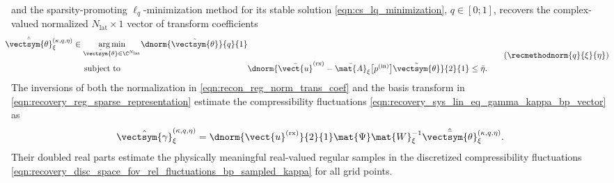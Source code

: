 and
the sparsity-promoting $\ell_{q}$-minimization method for
its stable solution
\eqref{eqn:cs_lq_minimization},
$q \in [ 0; 1 ]$, recovers
the complex-valued normalized
$N_{\text{lat}} \times 1$ vector of
transform coefficients
\begin{equation}
\begin{alignedat}{2}
  \hspace{-0.75em}
  \hat{\bar{\vectsym{\theta}}}_{\xi}^{(\kappa, q, \eta)}
  &\in
  \underset{ \tilde{\vectsym{\theta}} \in \C^{ N_{\text{lat}} } }{ \arg\min }
  \dnorm{ \tilde{\vectsym{\theta}} }{q}{1}\\
  &
  \mspace{24.5mu}
  \text{subject to}
  &
  \dnorm{ \bar{\vect{u}}^{(\text{rx})} - \bar{\mat{A}}_{\xi}\bigl[ p^{(\text{in})} \bigr] \tilde{\vectsym{\theta}} }{2}{1}
  &\leq
  \bar{\eta}.
\end{alignedat}
\tag{$\recmethodnorm{ q }{ \xi }{ \eta }$}
\label{eqn:recovery_reg_norm_lq_minimization}
\end{equation}
The inversions of both
the normalization in
\eqref{eqn:recon_reg_norm_trans_coef} and
the basis transform in
\eqref{eqn:recovery_reg_sparse_representation} estimate
the compressibility fluctuations
\eqref{eqn:recovery_sys_lin_eq_gamma_kappa_bp_vector} as
\begin{equation}
  \hat{\vectsym{\gamma}}_{\xi}^{(\kappa, q, \eta)}
  =
  \dnorm{ \vect{u}^{(\text{rx})} }{2}{1}
  \mat{\Psi}
  \mat{W}_{\xi}^{-1}
  \hat{\bar{\vectsym{\theta}}}_{\xi}^{(\kappa, q, \eta)}.
 \label{eqn:recovery_reg_norm_lq_minimization_sol_mat_params}
\end{equation}
Their doubled real parts estimate
the physically meaningful real-valued regular samples in
the discretized compressibility fluctuations
\eqref{eqn:recovery_disc_space_fov_rel_fluctuations_bp_sampled_kappa} for
all grid points.
